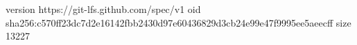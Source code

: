 version https://git-lfs.github.com/spec/v1
oid sha256:c570ff23dc7d2e16142fbb2430d97e60436829d3cb24e99e47f9995ee5aeecff
size 13227
